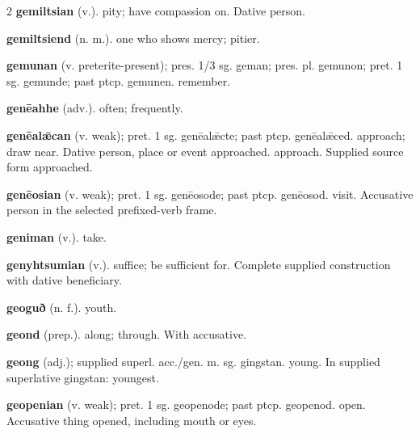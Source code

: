 \begin{multicols*}{2}
\textbf{gemiltsian} (v.). pity; have compassion on. Dative person.\par
\textbf{gemiltsiend} (n. m.). one who shows mercy; pitier.\par
\textbf{gemunan} (v. preterite-present); pres. 1/3 sg. geman; pres. pl. gemunon; pret. 1 sg. gemunde; past ptcp. gemunen. remember.\par
\textbf{genēahhe} (adv.). often; frequently.\par
\textbf{genēalǣcan} (v. weak); pret. 1 sg. genēalǣcte; past ptcp. genēalǣced. approach; draw near. Dative person, place or event approached. approach. Supplied source form approached.\par
\textbf{genēosian} (v. weak); pret. 1 sg. genēosode; past ptcp. genēosod. visit. Accusative person in the selected prefixed-verb frame.\par
\textbf{geniman} (v.). take.\par
\textbf{genyhtsumian} (v.). suffice; be sufficient for. Complete supplied construction with dative beneficiary.\par
\textbf{geoguð} (n. f.). youth.\par
\textbf{geond} (prep.). along; through. With accusative.\par
\textbf{geong} (adj.); supplied superl. acc./gen. m. sg. gingstan. young. In supplied superlative gingstan: youngest.\par
\textbf{geopenian} (v. weak); pret. 1 sg. geopenode; past ptcp. geopenod. open. Accusative thing opened, including mouth or eyes.\par

\end{multicols*}

